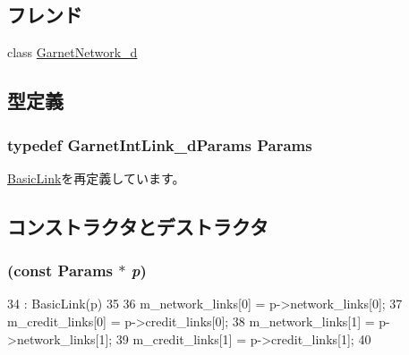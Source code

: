\subsection*{フレンド}
\begin{DoxyCompactItemize}
\item 
class \hyperlink{classGarnetIntLink__d_a38cee00c4f7913bbde36a9724f8d4075}{GarnetNetwork\_\-d}
\end{DoxyCompactItemize}


\subsection{型定義}
\hypertarget{classGarnetIntLink__d_a2e35ff7b9010a16d0099e9c6017f4fac}{
\subsubsection[{Params}]{\setlength{\rightskip}{0pt plus 5cm}typedef GarnetIntLink\_\-dParams {\bf Params}}}
\label{classGarnetIntLink__d_a2e35ff7b9010a16d0099e9c6017f4fac}


\hyperlink{classBasicLink_a2c371814143f1675a601e935bfbd756c}{BasicLink}を再定義しています。

\subsection{コンストラクタとデストラクタ}
\hypertarget{classGarnetIntLink__d_a7917933bd82e7ba3a9ca9f9122fefc17}{
\subsubsection[{GarnetIntLink\_\-d}]{ (const {\bf Params} $\ast$ {\em p})}}
\label{classGarnetIntLink__d_a7917933bd82e7ba3a9ca9f9122fefc17}



\begin{DoxyCode}
34     : BasicLink(p)
35 {
36     m_network_links[0] = p->network_links[0];
37     m_credit_links[0] = p->credit_links[0];
38     m_network_links[1] = p->network_links[1];
39     m_credit_links[1] = p->credit_links[1];
40 }
\end{DoxyCode}



